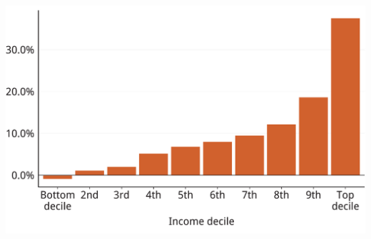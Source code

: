 \documentclass[tikz]{standalone}\usepackage[]{graphicx}\usepackage[]{color}
\newenvironment{knitrout}{}{} %
\begin{document}
\begin{knitrout}
\color{fgcolor}
\includegraphics[width=11.000in,height=7.00in]{./Super-tax-targeting/b5-super-atlas/Figure3-1-1} 

\end{knitrout}
\end{document}
